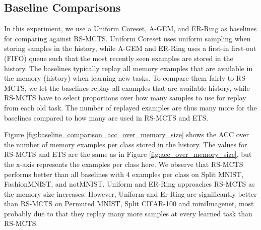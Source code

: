 
\subsection{Baseline Comparisons }

In this experiment, we use a Uniform Coreset, A-GEM, and ER-Ring as baselines for comparing against RS-MCTS. Uniform Coreset uses uniform sampling when storing samples in the history, while A-GEM and ER-Ring uses a first-in first-out (FIFO) queue such that the most recently seen examples are stored in the history. The baselines typically replay all memory examples that are available in the memory (history) when learning new tasks. To compare them fairly to RS-MCTS, we let the baselines replay all examples that are available history, while RS-MCTS have to select proportions over how many samples to use for replay from each old task. The number of replayed examples are thus many more for the baselines compared to how many are used in RS-MCTS and ETS. 

Figure \ref{fig:baseline_comparison_acc_over_memory_size} shows the ACC over the number of memory examples per class stored in the history. The values for RS-MCTS and ETS are the same as in Figure \ref{fig:acc_over_memory_size}, but the x-axis represents the examples per class here. We observe that RS-MCTS performs better than all baselines with 4 examples per class on Split MNIST, FashionMNIST, and notMNIST. Uniform and ER-Ring approaches RS-MCTS as the memory size increases. However, Uniform and Er-Ring are significantly better than RS-MCTS on Permuted MNIST, Split CIFAR-100 and miniImagenet, most probably due to that they replay many more samples at every learned task than RS-MCTS.  


